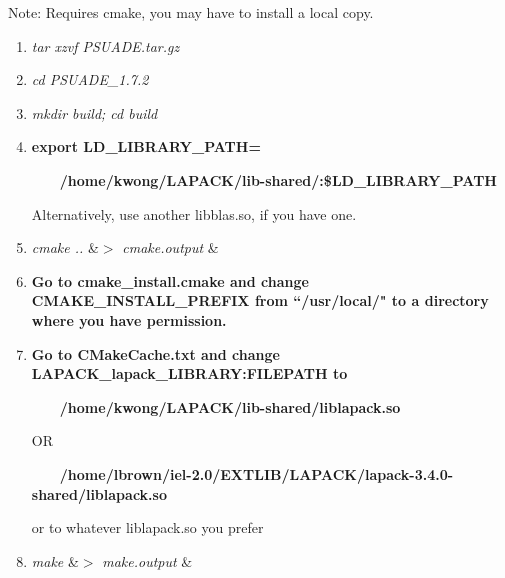 Note: Requires cmake, you may have to install a local copy.

\begin{enumerate}
\item \textit{tar xzvf PSUADE.tar.gz}
\item \textit{cd PSUADE\_1.7.2}
\item \textit{mkdir build; cd build}
\item {\bfseries export LD\_LIBRARY\_PATH=}

~~~~{\bfseries /home/kwong/LAPACK/lib-shared/:\$LD\_LIBRARY\_PATH}

Alternatively, use another libblas.so, if you have one.
\item \textit{cmake ..} \&$>$ \textit{cmake.output} \&
\item {\bfseries Go to cmake\_install.cmake and change CMAKE\_INSTALL\_PREFIX from ``/usr/local/" to a directory where you have permission.}
\item {\bfseries Go to CMakeCache.txt and change LAPACK\_lapack\_LIBRARY:FILEPATH to}
		
~~~~{\bfseries /home/kwong/LAPACK/lib-shared/liblapack.so}

OR

~~~~{\bfseries /home/lbrown/iel-2.0/EXTLIB/LAPACK/lapack-3.4.0-shared/liblapack.so}

or to whatever liblapack.so you prefer

\item \textit{make} \&$>$ \textit{make.output} \&
\end{enumerate}
